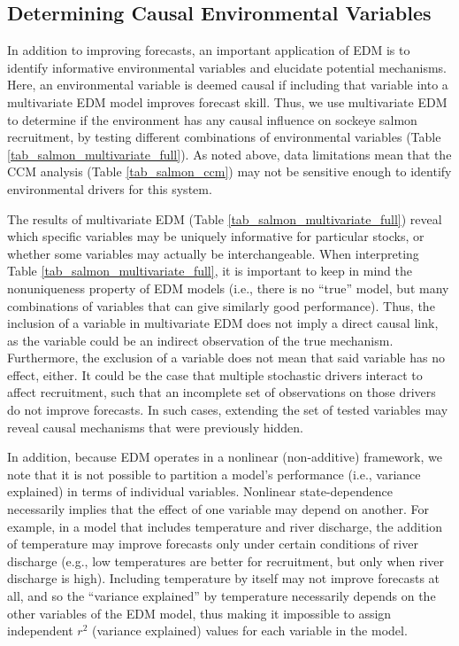 

\subsection{Determining Causal Environmental Variables}

In addition to improving forecasts, an important application of EDM is to identify informative environmental variables and elucidate potential mechanisms. Here, an environmental variable is deemed causal if including that variable into a multivariate EDM model improves forecast skill. Thus, we use multivariate EDM to determine if the environment has any causal influence on sockeye salmon recruitment, by testing different combinations of environmental variables (Table \ref{tab_salmon_multivariate_full}). As noted above, data limitations mean that the CCM analysis (Table \ref{tab_salmon_ccm}) may not be sensitive enough to identify environmental drivers for this system.

The results of multivariate EDM (Table \ref{tab_salmon_multivariate_full}) reveal which specific variables may be uniquely informative for particular stocks, or whether some variables may actually be interchangeable. When interpreting Table \ref{tab_salmon_multivariate_full}, it is important to keep in mind the nonuniqueness property of EDM models (i.e., there is no ``true'' model, but many combinations of variables that can give similarly good performance). Thus, the inclusion of a variable in multivariate EDM does not imply a direct causal link, as the variable could be an indirect observation of the true mechanism. Furthermore, the exclusion of a variable does not mean that said variable has no effect, either. It could be the case that multiple stochastic drivers interact to affect recruitment, such that an incomplete set of observations on those drivers do not improve forecasts. In such cases, extending the set of tested variables may reveal causal mechanisms that were previously hidden.

In addition, because EDM operates in a nonlinear (non-additive) framework, we note that it is not possible to partition a model's performance (i.e., variance explained) in terms of individual variables. Nonlinear state-dependence necessarily implies that the effect of one variable may depend on another. For example, in a model that includes temperature and river discharge, the addition of temperature may improve forecasts only under certain conditions of river discharge (e.g., low temperatures are better for recruitment, but only when river discharge is high). Including temperature by itself may not improve forecasts at all, and so the ``variance explained'' by temperature necessarily depends on the other variables of the EDM model, thus making it impossible to assign independent $r^2$ (variance explained) values for each variable in the model.

